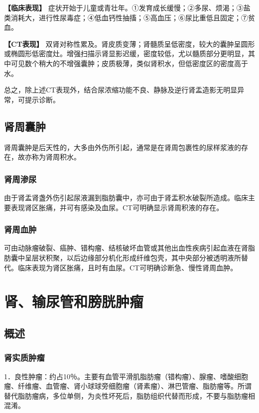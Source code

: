 \textbf{【临床表现】}
症状开始于儿童或青壮年。①发育成长缓慢；②多尿、烦渴；③盐类消耗大，进行性尿毒症；④低血钙性抽搐；⑤高血压；⑥尿比重低且固定；⑦贫血。

\textbf{【CT表现】}
双肾对称性累及。肾皮质变薄；肾髓质呈低密度，较大的囊肿呈圆形或椭圆形低密度灶。增强扫描示肾显影迟缓，密度较低，尤以髓质部分更明显，其中可见数个稍大的不增强囊肿；皮质极薄，类似肾积水，但低密度区的密度高于水。

总之，除上述CT表现外，结合尿浓缩功能不良、静脉及逆行肾盂造影无明显异常，可提示诊断。

\subsection{肾周囊肿}

肾周囊肿是后天性的，大多由外伤所引起，通常是在肾周包裹性的尿样浆液的存在，故亦称为肾周积水。

\subsubsection{肾周渗尿}

由于肾盂肾盏外伤引起尿液漏到脂肪囊中，亦可由于肾盂积水破裂所造成。临床主要表现肾区胀痛，并可有感染及血尿。CT可明确显示肾周积液的存在。

\subsubsection{肾周血肿}

可由动脉瘤破裂、癌肿、错构瘤、结核破坏血管或其他出血性疾病引起血液在肾脂肪囊中呈层状积聚，以后边缘部分机化形成纤维包壳，其中央部分被透明液所替代。临床表现为肾区胀痛，且时有血尿。CT可明确诊断急、慢性肾周血肿。

\section{肾、输尿管和膀胱肿瘤}

\subsection{概述}

\subsubsection{肾实质肿瘤}

1．良性肿瘤：约占10％。主要有血管平滑肌脂肪瘤（错构瘤）、腺瘤、嗜酸细胞瘤、纤维瘤、血管瘤、肾小球球旁细胞瘤（肾素瘤）、淋巴管瘤、脂肪瘤等。所谓替代脂肪瘤病，多位单侧，为炎性坏死后，脂肪组织代替而形成，不要与脂肪瘤相混淆。

